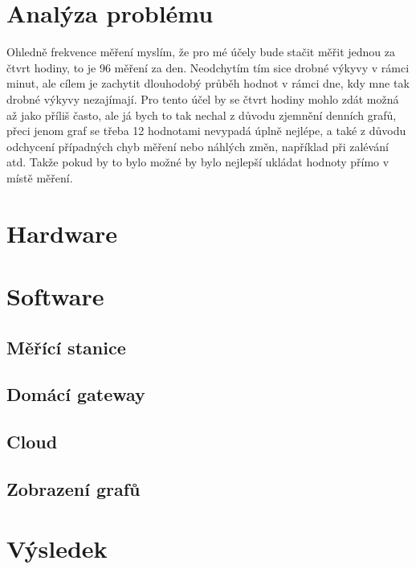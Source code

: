 \chapter{Analýza problému}
Ohledně frekvence měření myslím, že pro mé účely bude stačit měřit jednou za čtvrt hodiny, to je 96 měření za den. 
Neodchytím tím sice drobné výkyvy v rámci minut, ale cílem je zachytit dlouhodobý průběh hodnot v rámci dne, kdy mne tak 
drobné výkyvy nezajímají. Pro tento účel by se čtvrt hodiny mohlo zdát možná až jako příliš často, ale já bych to tak 
nechal z důvodu zjemnění denních grafů, přeci jenom graf se třeba 12 hodnotami nevypadá úplně nejlépe, a také z důvodu 
odchycení případných chyb měření nebo náhlých změn, například při zalévání atd.
Takže pokud by to bylo možné by bylo nejlepší ukládat hodnoty přímo v místě měření.


\chapter{Hardware}
\chapter{Software}
\section{Měřící stanice}
\section{Domácí gateway}
\section{Cloud}
\section{Zobrazení grafů}
\chapter{Výsledek}
